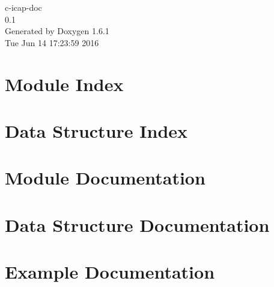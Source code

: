 \documentclass[a4paper]{book}
\begin{document}
\hypersetup{pageanchor=false}
\begin{titlepage}
\vspace*{7cm}
\begin{center}
{\Large c-\/icap-\/doc \\[1ex]\large 0.1 }\\
\vspace*{1cm}
{\large Generated by Doxygen 1.6.1}\\
\vspace*{0.5cm}
{\small Tue Jun 14 17:23:59 2016}\\
\end{center}
\end{titlepage}
\clearemptydoublepage
{}
\tableofcontents
\clearemptydoublepage
{}
\hypersetup{pageanchor=true}
\chapter{Module Index}

\chapter{Data Structure Index}

\chapter{Module Documentation}






















\chapter{Data Structure Documentation}








\chapter{Example Documentation}

\printindex
\end{document}
